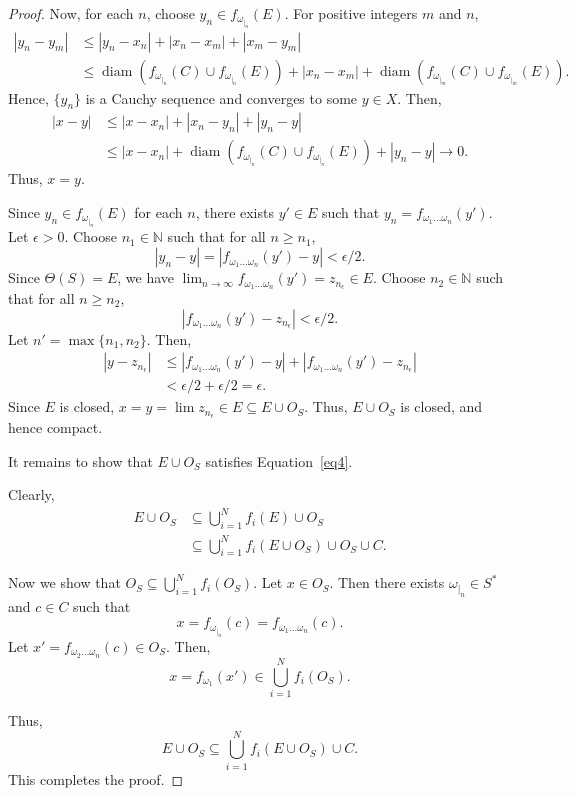 \documentclass[10pt,a4paper]{amsart}
\begin{document}
\begin{proof}
Now, for each $n$, choose $y_n \in f_{\omega_{|_n}}(E)$. For positive integers $m$ and $n$,
\[
\begin{aligned}
|y_n - y_m| &\leq |y_n - x_n| + |x_n - x_m| + |x_m - y_m| \\
&\leq \operatorname{diam}(f_{\omega_{|_n}}(C) \cup f_{\omega_{|_n}}(E)) + |x_n - x_m| + \operatorname{diam}(f_{\omega_{|_m}}(C) \cup f_{\omega_{|_m}}(E)).
\end{aligned}
\]
Hence, $\{y_n\}$ is a Cauchy sequence and converges to some $y \in X$. Then,
\[
\begin{aligned}
|x - y| &\leq |x - x_n| + |x_n - y_n| + |y_n - y| \\
&\leq |x - x_n| + \operatorname{diam}(f_{\omega_{|_n}}(C) \cup f_{\omega_{|_n}}(E)) + |y_n - y| \to 0.
\end{aligned}
\]
Thus, $x = y$.

Since $y_n \in f_{\omega_{|_n}}(E)$ for each $n$, there exists $y' \in E$ such that $y_n = f_{\omega_1 \ldots \omega_n}(y')$. Let $\epsilon > 0$. Choose $n_1 \in \mathbb{N}$ such that for all $n \geq n_1$,
\[
|y_n - y| = |f_{\omega_1 \ldots \omega_n}(y') - y| < \epsilon / 2.
\]
Since $\Theta(S) = E$, we have $\lim_{n \to \infty} f_{\omega_1 \ldots \omega_n}(y') = z_{n_\epsilon} \in E$. Choose $n_2 \in \mathbb{N}$ such that for all $n \geq n_2$,
\[
|f_{\omega_1 \ldots \omega_n}(y') - z_{n_\epsilon}| < \epsilon / 2.
\]
Let $n' = \max\{n_1, n_2\}$. Then,
\[
\begin{aligned}
|y - z_{n_\epsilon}| &\leq |f_{\omega_1 \ldots \omega_n}(y') - y| + |f_{\omega_1 \ldots \omega_n}(y') - z_{n_\epsilon}| \\
&< \epsilon / 2 + \epsilon / 2 = \epsilon.
\end{aligned}
\]
Since $E$ is closed, $x = y = \lim z_{n_\epsilon} \in E \subseteq E \cup O_S$. Thus, $E \cup O_S$ is closed, and hence compact.

It remains to show that $E \cup O_S$ satisfies Equation~\eqref{eq4}.

Clearly,
\[
\begin{aligned}
E \cup O_S &\subseteq \bigcup_{i=1}^N f_i(E) \cup O_S \\
&\subseteq \bigcup_{i=1}^N f_i(E \cup O_S) \cup O_S \cup C.
\end{aligned}
\]

Now we show that $O_S \subseteq \bigcup_{i=1}^N f_i(O_S)$. Let $x \in O_S$. Then there exists $\omega_{|_n} \in S^*$ and $c \in C$ such that
\[
x = f_{\omega_{|_n}}(c) = f_{\omega_1 \ldots \omega_n}(c).
\]
Let $x' = f_{\omega_2 \ldots \omega_n}(c) \in O_S$. Then,
\[
x = f_{\omega_1}(x') \in \bigcup_{i=1}^N f_i(O_S).
\]

Thus,
\[
E \cup O_S \subseteq \bigcup_{i=1}^N f_i(E \cup O_S) \cup C.
\]
This completes the proof.
\end{proof}
\end{document}
